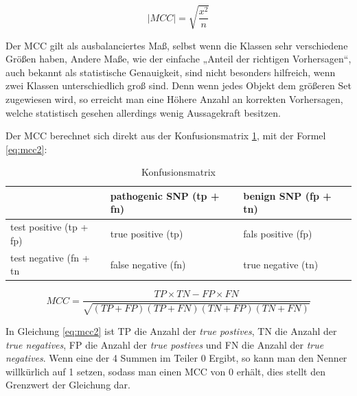 \begin{equation}
    |MCC| = \sqrt{\frac{x^2}{n}}
    \label{eq:mcc}
\end{equation}

Der MCC gilt als ausbalanciertes Maß, selbst wenn die Klassen sehr verschiedene Größen haben, Andere Maße, wie der einfache „Anteil der richtigen Vorhersagen“, auch bekannt als statistische Genauigkeit, sind nicht besonders hilfreich, wenn zwei Klassen unterschiedlich groß sind. Denn wenn jedes Objekt dem größeren Set zugewiesen wird, so erreicht man eine Höhere Anzahl an korrekten Vorhersagen, welche statistisch gesehen allerdings wenig Aussagekraft besitzen.

Der MCC berechnet sich direkt aus der Konfusionsmatrix \ref{table:konfusionsmatrix}, mit der Formel \ref{eq:mcc2}:

\begin{table}[]
    \centering
    \caption{Konfusionsmatrix }
    \label{table:konfusionsmatrix}
    \begin{tabular}{l|l|l|}
        \cline{2-3}
 & pathogenic SNP (tp + fn) & benign SNP (fp + tn) \\ \hline
\multicolumn{1}{|l|}{test positive (tp + fp)} & \cellcolor[HTML]{9AFF99}true positive (tp) & \cellcolor[HTML]{FFCCC9}fals positive (fp) \\ \hline
\multicolumn{1}{|l|}{test negative (fn + tn} & \cellcolor[HTML]{FFFFC7}false negative (fn) & \cellcolor[HTML]{9AFF99}true negative (tn) \\ \hline
    \end{tabular}
\end{table}

\begin{equation}
    MCC = \frac{TP \times TN - FP \times FN}{\sqrt{(TP + FP)(TP + FN)(TN + FP)(TN + FN)}}
    \label{eq:mcc2}
\end{equation}

In Gleichung \ref{eq:mcc2} ist TP die Anzahl der \emph{true postives}, TN die Anzahl der \emph{true negatives}, FP die Anzahl der \emph{true postives} und FN die Anzahl der \emph{true negatives}. Wenn eine der 4 Summen im Teiler 0 Ergibt, so kann man den Nenner willkürlich auf 1 setzen, sodass man einen MCC von 0 erhält, dies stellt den Grenzwert der Gleichung dar.


